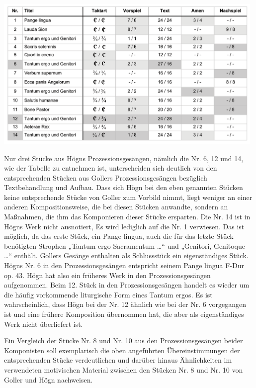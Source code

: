 \documentclass[a4paper]{article}
\begin{document}
{%
\includegraphics[width=13.088cm,height=7.486cm]{pictures/zulassungsarbeit-img082.png}
 \par}
Nur drei Stücke aus Högns Prozessionsgesängen, nämlich die Nr. 6, 12 und
14, wie der Tabelle zu entnehmen ist, unterscheiden sich deutlich von
den entsprechenden Stücken aus Gollers Prozessionsgesängen bezüglich
Textbehandlung und Aufbau. Dass sich Högn bei den eben genannten
Stücken keine entsprechende Stücke von Goller zum Vorbild nimmt, liegt
weniger an einer anderen Kompositionsweise, die bei diesen Stücken
anwandte, sondern an Maßnahmen, die ihm das Komponieren dieser Stücke
ersparten. Die Nr. 14 ist in Högns Werk nicht ausnotiert, Es wird
lediglich auf die Nr. 1 verwiesen. Das ist möglich, da das erste Stück,
ein Pange lingua, auch die für das letzte Stück benötigten Strophen
„Tantum ergo Sacramentum …“ und „Genitori, Genitoque …“ enthält.
Gollers Gesänge enthalten als Schlussstück ein eigenständiges Stück.
Högns Nr. 6 in den Prozessionsgesängen entspricht seinem Pange lingua
F-Dur op. 43. Högn hat also ein früheres Werk in den
Prozessionsgesängen aufgenommen. Beim 12. Stück in den
Prozessionsgesängen handelt es wieder um die häufig vorkommende
liturgische Form eines Tantum ergos. Es ist wahrscheinlich, dass Högn
bei der Nr. 12 ähnlich wie bei der Nr. 6 vorgegangen ist und eine
frühere Komposition übernommen hat, die aber als eigenständiges Werk
nicht überliefert ist.

Ein Vergleich der Stücke Nr. 8 und Nr. 10 aus den Prozessionsgesängen
beider Komponisten soll exemplarisch die oben angeführten
Übereinstimmungen der entsprechenden Stücke verdeutlichen und darüber
hinaus Ähnlichkeiten im verwendeten motivischen Material zwischen den
Stücken Nr. 8 und Nr. 10 von Goller und Högn nachweisen.
\end{document}
